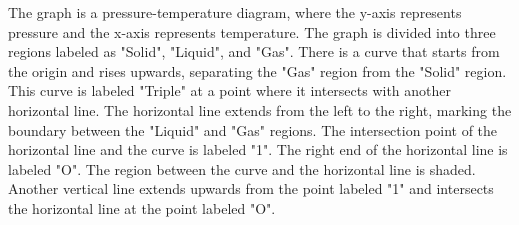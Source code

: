 The graph is a pressure-temperature diagram, where the y-axis represents pressure and the x-axis represents temperature. The graph is divided into three regions labeled as "Solid", "Liquid", and "Gas". There is a curve that starts from the origin and rises upwards, separating the "Gas" region from the "Solid" region. This curve is labeled "Triple" at a point where it intersects with another horizontal line. The horizontal line extends from the left to the right, marking the boundary between the "Liquid" and "Gas" regions. The intersection point of the horizontal line and the curve is labeled "1". The right end of the horizontal line is labeled "O". The region between the curve and the horizontal line is shaded. Another vertical line extends upwards from the point labeled "1" and intersects the horizontal line at the point labeled "O".